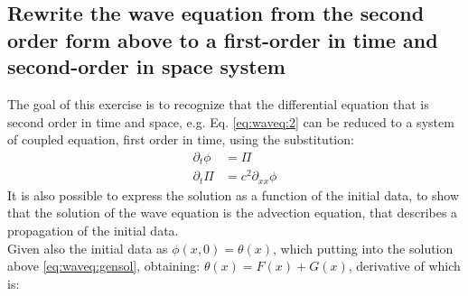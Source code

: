 \documentclass{article}
\begin{document}
\subsection{Rewrite the wave equation from the second order form above to a	first-order in time and second-order in space system}
The goal of this exercise is to recognize that the differential equation that is second order in time and space, e.g. Eq. \ref{eq:waveq:2} can be reduced to a system of coupled equation, first order in time, using the substitution:
\begin{equation}
	\begin{aligned}
	\partial_t\phi &= \Pi \\
	\partial_t\Pi &= c^2\partial_{xx}\phi
	\end{aligned}
\end{equation}
%
It is also possible to express the solution as a function of the initial data, to show that the solution of the wave equation is the advection equation, that describes a propagation of the initial data. \\
%
Given also the initial data as $\phi(x,0)=\theta(x)$, which putting into the solution above \ref{eq:waveq:gensol}, obtaining: $\theta(x) = F(x) + G(x)$, derivative of which is:
\end{document}
